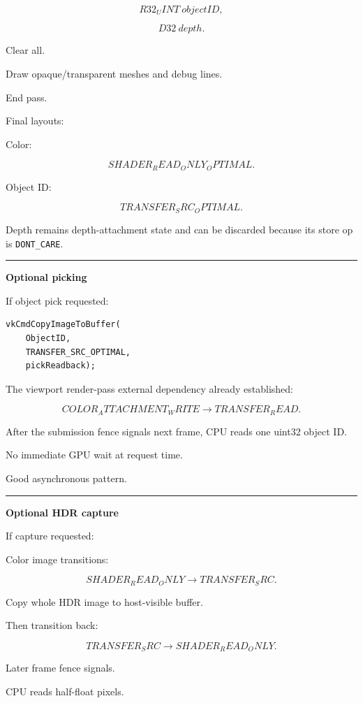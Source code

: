 \[
R32_UINT\ objectID,
\]

\[
D32\ depth.
\]

Clear all.

Draw opaque/transparent meshes and debug lines.

End pass.

Final layouts:

Color:

\[
SHADER_READ_ONLY_OPTIMAL.
\]

Object ID:

\[
TRANSFER_SRC_OPTIMAL.
\]

Depth remains depth-attachment state and can be discarded because its store op is \texttt{DONT\_CARE}.

\begin{center}\rule{0.5\linewidth}{0.5pt}\end{center}

\textbf{Optional picking}

If object pick requested:

\begin{verbatim}
vkCmdCopyImageToBuffer(
    ObjectID,
    TRANSFER_SRC_OPTIMAL,
    pickReadback);
\end{verbatim}

The viewport render-pass external dependency already established:

\[
COLOR_ATTACHMENT_WRITE
\rightarrow
TRANSFER_READ.
\]

After the submission fence signals next frame, CPU reads one uint32 object ID.

No immediate GPU wait at request time.

Good asynchronous pattern.

\begin{center}\rule{0.5\linewidth}{0.5pt}\end{center}

\textbf{Optional HDR capture}

If capture requested:

Color image transitions:

\[
SHADER_READ_ONLY
\rightarrow
TRANSFER_SRC.
\]

Copy whole HDR image to host-visible buffer.

Then transition back:

\[
TRANSFER_SRC
\rightarrow
SHADER_READ_ONLY.
\]

Later frame fence signals.

CPU reads half-float pixels.


